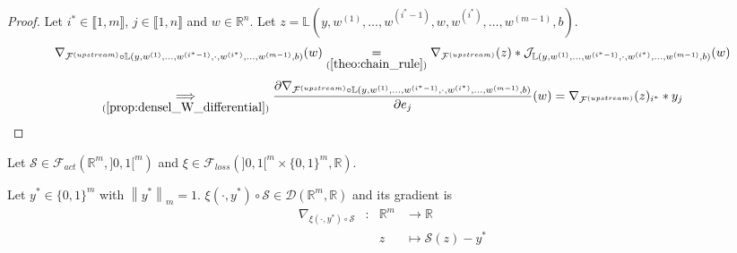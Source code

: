 \documentclass[11pt,en]{elegantpaper}
\newcommand{\norm}[1]{\left\lVert#1\right\rVert}
\newcommand{\Real}{\mathbb{R}}
\begin{document}
\begin{proof}
  Let $i^* \in \llbracket 1,m \rrbracket$, $j \in \llbracket 1,n \rrbracket$ and $w \in \Real^n$.
  Let $z = \mathbb{L}(y,w^{(1)},\ldots,w^{(i^*-1)},w,w^{(i^*)},\ldots,w^{(m-1)},b)$. \begin{equation*}
    \begin{gathered}
      \nabla_{\mathcal{F}^{(upstream)} \circ \mathbb{L}(y,w^{(1)},\ldots,w^{(i^*-1)},\cdot,w^{(i^*)},\ldots,w^{(m-1)},b)}(w)
        \underset{(\ref{theo:chain_rule})}{=} \nabla_{\mathcal{F}^{(upstream)}}(z) *
        \mathcal{J}_{\mathbb{L}(y,w^{(1)},\ldots,w^{(i^*-1)},\cdot,w^{(i^*)},\ldots,w^{(m-1)},b)}(w)
    \end{gathered}
  \end{equation*}
  \begin{equation*}
    \begin{gathered}
      \underset{(\ref{prop:densel_W_differential})}{\implies}
        \frac{\partial \nabla_{\mathcal{F}^{(upstream)} \circ \mathbb{L}(y,w^{(1)},\ldots,w^{(i^*-1)},\cdot,w^{(i^*)},\ldots,w^{(m-1)},b)}}{\partial e_j} (w)
        = \nabla_{\mathcal{F}^{(upstream)}}(z)_{i^*} * y_j
    \end{gathered}
  \end{equation*}
\end{proof}

\begin{proposition}
  {\normalfont
    Let $\mathcal{S} \in \mathcal{F}_{act}(\Real^m,]0,1[^m)$ and $\xi \in \mathcal{F}_{loss}(]0,1[^m \times \{0,1\}^m, \Real)$. \par
    Let $y^* \in \{0,1\}^m$ with $\norm{y^*}_m = 1$.
    $\xi(\cdot,y^*) \circ \mathcal{S} \in \mathcal{D}(\Real^m,\Real)$ and its gradient is \begin{equation} \label{prop:cce_softmax_differential}
      \begin{array}{llll}
        \nabla_{\xi(\cdot,y^*) \circ \mathcal{S}} & : & \Real^m  & \longrightarrow \Real \\
        &   & z & \longmapsto \mathcal{S}(z) - y^*
      \end{array}
    \end{equation}
  }
\end{proposition}
\end{document}
